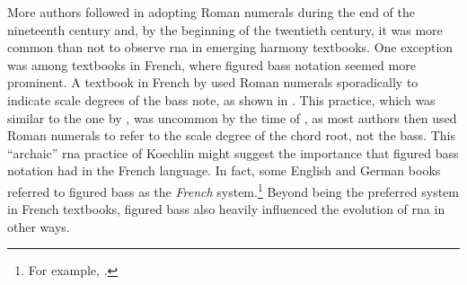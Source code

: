 

More authors followed in adopting Roman numerals during the
end of the nineteenth century and, by the beginning of the
twentieth century, it was more common than not to observe
\gls{rna} in emerging harmony textbooks. One exception was
among textbooks in French, where figured bass notation
seemed more prominent. A textbook in French by
\textcite{koechlin1928traite} used Roman numerals
sporadically to indicate scale degrees of the bass note, as
shown in .
This practice, which was similar to the one by
\textcite{hamilton1840catechism}, was uncommon by the time
of \textcite{koechlin1928traite}, as most authors then used
Roman numerals to refer to the scale degree of the chord
root, not the bass. This ``archaic'' \gls{rna} practice of
Koechlin might suggest the importance that figured bass
notation had in the French language. In fact, some English
and German books referred to figured bass as the
\emph{French} system.\footnote{For example,
\textcite{norris1894practical}.} Beyond being the preferred
system in French textbooks, figured bass also heavily
influenced the evolution of \gls{rna} in other ways.


